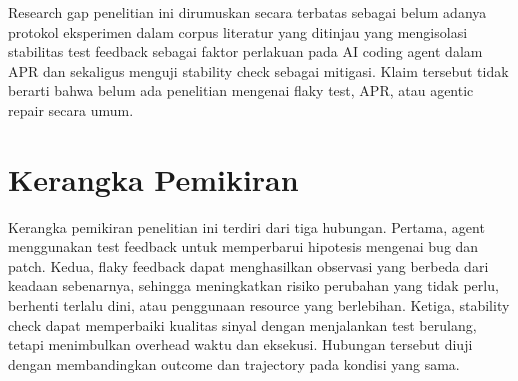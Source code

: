 Research gap penelitian ini dirumuskan secara terbatas sebagai belum adanya protokol eksperimen dalam corpus literatur yang ditinjau yang mengisolasi stabilitas test feedback sebagai faktor perlakuan pada AI coding agent dalam APR dan sekaligus menguji stability check sebagai mitigasi. Klaim tersebut tidak berarti bahwa belum ada penelitian mengenai flaky test, APR, atau agentic repair secara umum.

\section{Kerangka Pemikiran}

Kerangka pemikiran penelitian ini terdiri dari tiga hubungan. Pertama, agent menggunakan test feedback untuk memperbarui hipotesis mengenai bug dan patch. Kedua, flaky feedback dapat menghasilkan observasi yang berbeda dari keadaan sebenarnya, sehingga meningkatkan risiko perubahan yang tidak perlu, berhenti terlalu dini, atau penggunaan resource yang berlebihan. Ketiga, stability check dapat memperbaiki kualitas sinyal dengan menjalankan test berulang, tetapi menimbulkan overhead waktu dan eksekusi. Hubungan tersebut diuji dengan membandingkan outcome dan trajectory pada kondisi yang sama.
